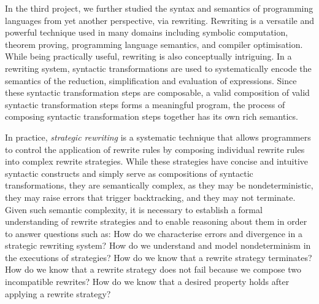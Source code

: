 In the third project, we further studied the syntax and semantics of programming languages from yet another perspective, via rewriting.
Rewriting is a versatile and powerful technique used in many domains including symbolic computation, theorem proving, programming language semantics, and compiler optimisation.
While being practically useful, rewriting is also conceptually intriguing. In a rewriting system, syntactic transformations are used to systematically encode the semantics of the reduction, simplification and evaluation of expressions. Since these syntactic transformation steps are composable, a valid composition of valid syntactic transformation steps forms a meaningful program, the process of composing syntactic transformation steps together has its own rich semantics. 

In practice, \emph{strategic rewriting} is a systematic technique that allows programmers to control the application of rewrite rules by composing individual rewrite rules into complex rewrite strategies. While these strategies have concise and intuitive syntactic constructs and simply serve as compositions of syntactic transformations, they are semantically complex, as they may be nondeterministic, they may raise errors that trigger backtracking, and they may not terminate.
Given such semantic complexity, it is necessary to establish a formal understanding of rewrite strategies and to enable reasoning about them in order to answer questions such as:
How do we characterise errors and divergence in a strategic rewriting system?
How do we understand and model nondeterminism in the executions of strategies?
How do we know that a rewrite strategy terminates?
How do we know that a rewrite strategy does not fail because we compose two incompatible rewrites?
How do we know that a desired property holds after applying a rewrite strategy?


